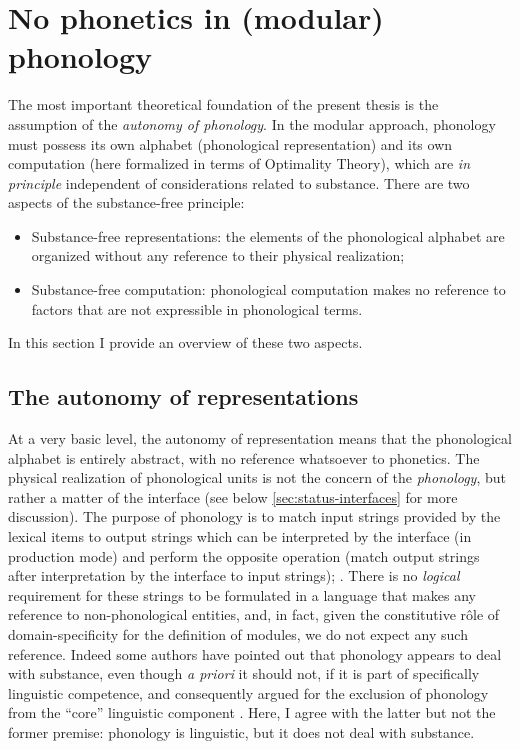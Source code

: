\section{No phonetics in (modular) phonology}
\label{sec:no-phonetics-modular}

The most important theoretical foundation of the present thesis is the assumption of the \emph{autonomy of phonology}. In the modular approach, phonology must possess its own alphabet (\ie phonological representation) and its own computation (here formalized in terms of Optimality Theory), which are \emph{in principle} independent of considerations related to substance. There are two aspects of the substance\hyp free principle:

\begin{itemize}
\item Substance\hyp free representations: the elements of the phonological alphabet are organized without any reference to their physical realization;
\item Substance\hyp free computation: phonological computation makes no reference to factors that are not expressible in phonological terms.
\end{itemize}

In this section I provide an overview of these two aspects.

\subsection{The autonomy of representations}
\label{sec:auton-repr}

At a very basic level, the autonomy of representation means that the phonological alphabet is entirely abstract, with no reference whatsoever to phonetics. The physical realization of phonological units is not the concern of the \emph{phonology}, but rather a matter of the interface (see below \cref{sec:status-interfaces} for more discussion). The purpose of phonology is to match input strings provided by the lexical items to output strings which can be interpreted by the interface (in production mode) and perform the opposite operation (match output strings after interpretation by the interface to input strings); \cf \citet{keating88:_under,moren-foa}. There is no \emph{logical} requirement for these strings to be formulated in a language that makes any reference to non\hyp phonological entities, and, in fact, given the constitutive rôle of domain\hyp specificity for the definition of modules, we do not expect any such reference. Indeed some authors \citep[\egm][]{burton-roberts00:_where} have pointed out that phonology appears to deal with substance, even though \emph{a priori} it should not, if it is part of specifically linguistic competence, and consequently argued for the exclusion of phonology from the \enquote{core} linguistic component \citep[\cf also][]{samuels11:_phonol}. Here, I agree with the latter but not the former premise: phonology is linguistic, but it does not deal with substance.

